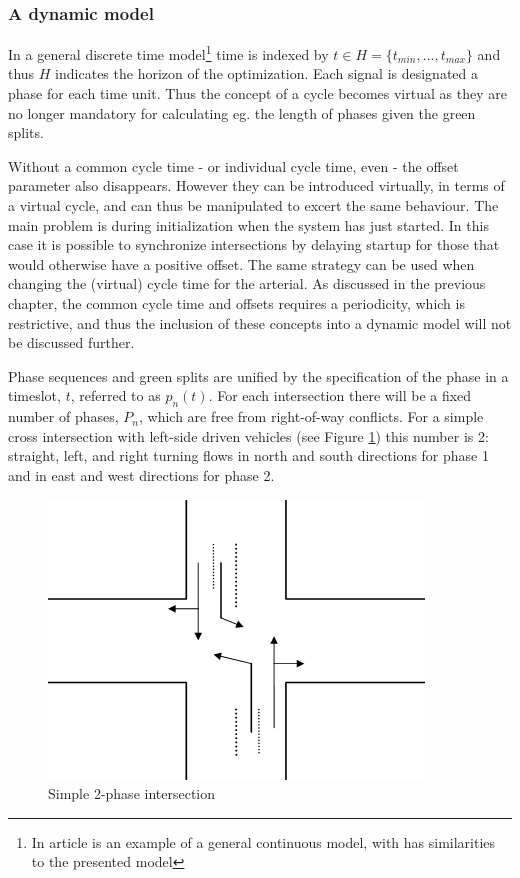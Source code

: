 \subsubsection*{A dynamic model}
\label{dynamicmodel}
In a general discrete time model\footnote{In article \cite{36} is an example of a general continuous model, with has similarities to the presented model} time is indexed by $t \in H = \lbrace t_{min},...,t_{max} \rbrace$ and thus $H$ indicates the horizon of the optimization. Each signal is designated a phase for each time unit. Thus the concept of a cycle becomes virtual as they are no longer mandatory for calculating eg. the length of phases given the green splits.

Without a common cycle time - or individual cycle time, even - the offset parameter also disappears. However they can be introduced virtually, in terms of a virtual cycle, and can thus be manipulated to excert the same behaviour. 
The main problem is during initialization when the system has just started. In this case it is possible to synchronize intersections by delaying startup for those that would otherwise have a positive offset. The same strategy can be used when changing the (virtual) cycle time for the arterial. As discussed in the previous chapter, the common cycle time and offsets requires a periodicity, which is restrictive, and thus the inclusion of these concepts into a dynamic model will not be discussed further.

Phase sequences and green splits are unified by the specification of the phase in a timeslot, $t$, referred to as $p_n(t)$. For each intersection there will be a fixed number of phases, $P_n$, which are free from right-of-way conflicts. For a simple cross intersection with left-side driven vehicles (see Figure \ref{fig:simple_intersection}) this number is 2: straight, left, and right turning flows in north and south directions for phase 1 and in east and west directions for phase 2.

\begin{figure}[!ht]
\begin{center}
\includegraphics[scale=0.4]{simple_intersection.png} 
\end{center}
\caption{Simple 2-phase intersection}
\label{fig:simple_intersection}
\end{figure}

